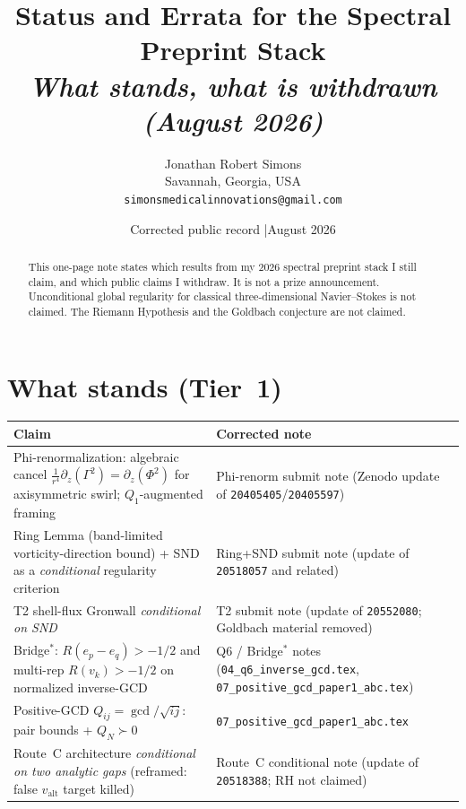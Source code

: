\documentclass[11pt]{article}
\title{\textbf{Status and Errata for the Spectral Preprint Stack}\\[6pt]
\large\textit{What stands, what is withdrawn (August 2026)}}
\author{Jonathan Robert Simons\\
Savannah, Georgia, USA\\
\texttt{simonsmedicalinnovations@gmail.com}}
\date{Corrected public record \quad|\quad August 2026}
\begin{document}
\maketitle

\begin{abstract}
This one-page note states which results from my 2026 spectral preprint
stack I still claim, and which public claims I withdraw. It is not a
prize announcement. Unconditional global regularity for classical
three-dimensional Navier--Stokes is not claimed. The Riemann Hypothesis
and the Goldbach conjecture are not claimed.
\end{abstract}

\section*{What stands (Tier~1)}

\begin{center}
\renewcommand{\arraystretch}{1.25}
\begin{tabular}{>{\raggedright\arraybackslash}p{7.2cm}
                >{\raggedright\arraybackslash}p{6.5cm}}
\toprule
\textbf{Claim} & \textbf{Corrected note}\\
\midrule
\rowcolor{lightgreen}
Phi-renormalization: algebraic cancel
$\frac1{r^4}\partial_z(\Gamma^2)=\partial_z(\Phi^2)$
for axisymmetric swirl; $Q_1$-augmented framing
& Phi-renorm submit note
(Zenodo update of \texttt{20405405}/\texttt{20405597})\\
\rowcolor{lightgreen}
Ring Lemma (band-limited vorticity-direction bound)
+ SND as a \emph{conditional} regularity criterion
& Ring+SND submit note
(update of \texttt{20518057} and related)\\
\rowcolor{lightgreen}
T2 shell-flux Gronwall \emph{conditional on SND}
& T2 submit note
(update of \texttt{20552080}; Goldbach material removed)\\
\rowcolor{lightgreen}
Bridge$^*$: $R(e_p-e_q)>-1/2$ and multi-rep $R(v_k)>-1/2$
on normalized inverse-GCD
& Q6 / Bridge$^*$ notes
(\texttt{04\_q6\_inverse\_gcd.tex}, \texttt{07\_positive\_gcd\_paper1\_abc.tex})\\
\rowcolor{lightgreen}
Positive-GCD $Q_{ij}=\gcd/\sqrt{ij}$: pair bounds + $Q_N\succ 0$
& \texttt{07\_positive\_gcd\_paper1\_abc.tex}\\
\rowcolor{lightgreen}
Route~C architecture \emph{conditional on two analytic gaps}
(reframed: false $v_{\mathrm{alt}}$ target killed)
& Route~C conditional note
(update of \texttt{20518388}; RH not claimed)\\
\bottomrule
\end{tabular}
\end{center}
\end{document}
